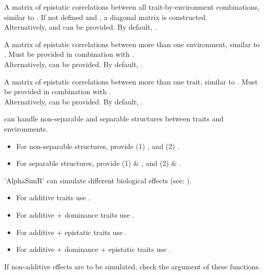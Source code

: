 \documentclass[a4paper]{book}
\begin{document}
\begin{Arguments}
\begin{ldescription}
\item[\code{cor\_AA}] A matrix of epistatic correlations between all trait-by-environment
combinations, similar to . If not defined and ,
a diagonal matrix is constructed. \\{}
Alternatively,  and  can be provided. By default,
.

\item[\code{E\_cor\_AA}] A matrix of epistatic correlations between more than one environment, similar
to . Must be provided in combination with . \\{}
Alternatively,  can be provided. By default, .

\item[\code{T\_cor\_AA}] A matrix of epistatic correlations between more than one trait, similar to
. Must be provided in combination with . \\{}
Alternatively,  can be provided. By default, .
\end{ldescription}
\end{Arguments}
%
\begin{Details}\relax
{} can handle non-separable and separable structures between traits and
environments.
\begin{itemize}

\item{} For non-separable structures, provide (1) , and (2) .
\item{} For separable structures, provide (1)  \& , and (2)
 \& . \\{}

\end{itemize}


 'AlphaSimR' can simulate different biological effects (see:
).
\begin{itemize}

\item{} For additive traits use .
\item{} For additive + dominance traits use .
\item{} For additive + epistatic traits use .
\item{} For additive + dominance + epistatic traits use .

\end{itemize}

If non-additive effects are to be simulated, check the  argument of these
functions.
\end{Details}
\end{document}
